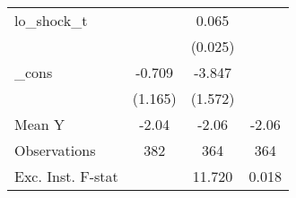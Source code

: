 {\begin{tabular}{l*{3}{c}}
\addlinespace
lo\_shock\_t  &                     &       0.065\sym{**} &                     \\
            &                     &     (0.025)         &                     \\
\addlinespace
\_cons      &      -0.709         &      -3.847\sym{**} &                     \\
            &     (1.165)         &     (1.572)         &                     \\
\midrule
Mean Y      &       -2.04         &       -2.06         &       -2.06         \\
Observations&         382         &         364         &         364         \\
Exc. Inst. F-stat&                     &      11.720         &       0.018         \\
\bottomrule
\end{tabular}
}

